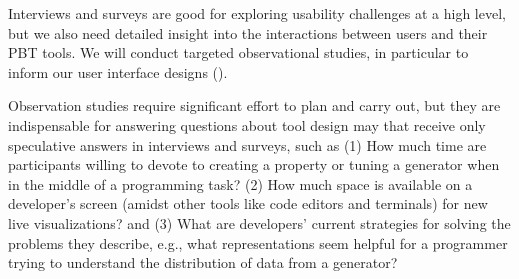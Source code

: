
%
%
Interviews and surveys are good for exploring usability challenges
at a high level, but we also need detailed insight into the interactions
between users and their PBT tools.  We will
conduct targeted observational studies, in particular to inform our
user interface designs ().

Observation studies require significant effort to plan and
carry out, but they
are indispensable for answering questions about tool design may that
receive only
speculative answers in interviews and surveys, such as
(1) How much time
are participants willing to devote to
creating a property or tuning a generator when in the
middle of a programming task?
(2) How much space is available on a developer's
screen (amidst other tools like code editors and terminals) for
new live
visualizations? and
(3) What are developers' current strategies for solving the
problems they describe, e.g., what representations
seem helpful
for a programmer trying to understand the distribution of data from a
generator?

